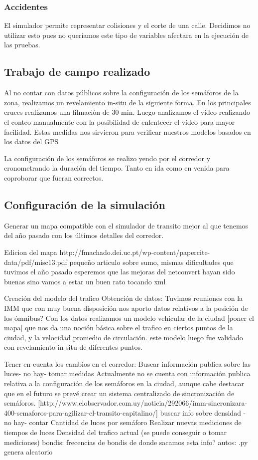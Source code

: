 \subsubsection{Accidentes}
El simulador permite representar colisiones y el corte de una calle. Decidimos no utilizar esto pues no queríamos este tipo de variables afectara en la ejecución de las pruebas.

\subsection{Trabajo de campo realizado}
Al no contar con datos públicos sobre la configuración de los semáforos de la zona, realizamos un revelamiento in-situ de la siguiente forma.
En los principales cruces realizamos una filmación de 30 min. Luego analizamos el vídeo realizando el conteo manualmente con la posibilidad de enlentecer el vídeo para mayor facilidad.
Estas medidas nos sirvieron para verificar nuestros modelos basados en los datos del GPS 

La configuración de los semáforos se realizo yendo por el corredor y cronometrando la duración del tiempo. Tanto en ida como en venida para coproborar que fueran correctos.



\subsection{Configuración de la simulación}


Generar un mapa compatible con el simulador de transito mejor al que tenemos del año pasado con los últimos detalles del corredor.

Edicion del mapa http://fmachado.dei.uc.pt/wp-content/papercite-data/pdf/misc13.pdf pequeño articulo sobre sumo, mismas dificultades que tuvimos el año pasado esperemos que las mejoras del netconvert hayan sido buenas sino vamos a estar un buen rato tocando xml

Creación del modelo del trafico
	Obtención de datos: Tuvimos reuniones con la IMM que con muy buena disposición nos aporto datos relativos a la posición de los ómnibus?
	Con los datos realizamos un modelo vehicular de la ciudad [poner el mapa] que nos da una noción básica sobre el trafico en ciertos puntos de la ciudad, y la velocidad promedio de circulación.
	este modelo luego fue validado con revelamiento in-situ de diferentes puntos.

Tener en cuenta los cambios en el corredor:
	Buscar información publica sobre las luces- no hay- tomar medidas 
	Actualmente no se cuenta con información publica relativa a la configuración de los semáforos en la ciudad, aunque cabe destacar que en el futuro se prevé crear un sistema centralizado de sincronización de semáforos.  [http://www.elobservador.com.uy/noticia/292066/imm-sincronizara-400-semaforos-para-agilizar-el-transito-capitalino/] 
	buscar info sobre densidad - no hay- contar
	Cantidad de luces por semáforo
	Realizar nuevas mediciones de tiempos de luces
	Densidad del trafico actual (se puede conseguir o tomar mediciones)
	bondis: frecencias de bondis
	de donde sacamos esta info?
	autos: .py genera aleatorio


